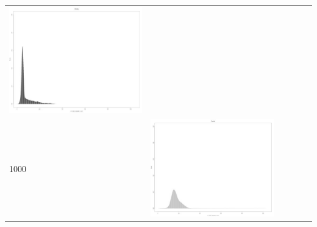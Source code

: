 \begin{table}[htbp]
{\begin{tabular}{l | ccccc}
\begin{minipage}{.15\textwidth}
     			 	\includegraphics[width=\linewidth]{images/mema-dens-graph/I10}
    				 \end{minipage}\\	
		1000   &	 \begin{minipage}{.15\textwidth}
     			 	\includegraphics[width=\linewidth]{images/mema-dens-graph/I4}
    				 \end{minipage}
    			   &	 \begin{minipage}{.15\textwidth}

\end{minipage}
\end{tabular}}
\end{table}
